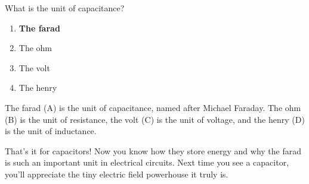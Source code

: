 \begin{tcolorbox}[colback=gray!10!white,colframe=black!75!black,title={T5C02}]
    What is the unit of capacitance?
    \begin{enumerate}[label=\Alph*),noitemsep]
        \item \textbf{The farad}
        \item The ohm
        \item The volt
        \item The henry
    \end{enumerate}
\end{tcolorbox}

The farad (A) is the unit of capacitance, named after Michael Faraday. The ohm (B) is the unit of resistance, the volt (C) is the unit of voltage, and the henry (D) is the unit of inductance.

That's it for capacitors! Now you know how they store energy and why the farad is such an important unit in electrical circuits. Next time you see a capacitor, you'll appreciate the tiny electric field powerhouse it truly is.
